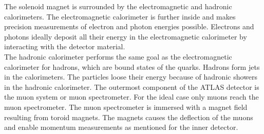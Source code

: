 The solenoid magnet is surrounded by the electromagnetic and hadronic calorimeters.
The electromagnetic calorimeter is further inside and makes precision measurements of electron and photon energies possible.
Electrons and photons ideally deposit all their energy in the electromagnetic calorimeter by interacting with the detector material.\\
The hadronic calorimeter performs the same goal as the electromagnetic calorimeter for hadrons, which are bound states of the quarks.
Hadrons form jets in the calorimeters.
The particles loose their energy because of hadronic showers in the hadronic calorimeter.
The outermost component of the ATLAS detector is the muon system or muon spectrometer.
For the ideal case only muons reach the muon spectrometer.
The muon spectrometer is immersed with a magnet field resulting from toroid magnets.
The magnets causes the deflection of the muons and enable momentum measurements as mentioned for the inner detector.





